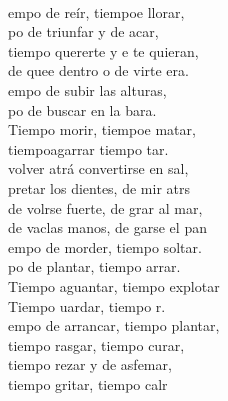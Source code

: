 \documentclass[12pt]{article}
\begin{document}
\begin{multicols*}{2}
\begin{cancion}%
	     \\
	empo de reír, tiempoe llorar,\\
	po de triunfar y de acar,\\
	tiempo  quererte y e te quieran,\\
	de quee dentro o de virte era.\\
	empo de subir las alturas,\\
	po de buscar en la bara.\\
	Tiempo  morir, tiempoe matar,\\
	tiempoagarrar tiempo  tar.\\
	 volver atrá convertirse en sal,\\
	pretar los dientes, de mir atrs\\
	de volrse fuerte, de grar al mar,\\
	de vaclas manos, de garse el pan\\
	empo de morder, tiempo  soltar.\\
	po de plantar, tiempo  arrar.\\
	Tiempo  aguantar, tiempo  explotar\\
	Tiempo uardar, tiempo  r.\\
	empo de arrancar, tiempo  plantar,\\
	tiempo  rasgar, tiempo curar,\\
	tiempo  rezar y de asfemar,\\
	tiempo  gritar, tiempo  calr\\\jump\\

\end{cancion}
\end{multicols*}
\end{document}

